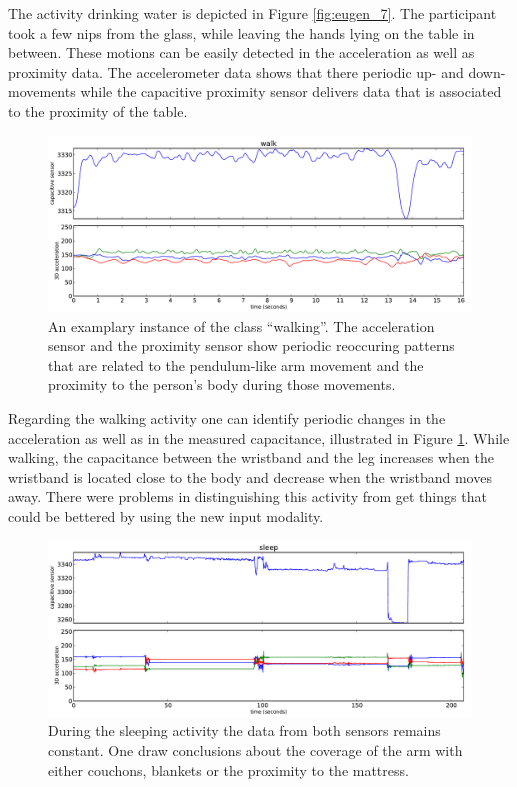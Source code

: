 \documentclass[runningheads,a4paper]{llncs}
\begin{document}
The activity drinking water is depicted in Figure \ref{fig:eugen_7}. The participant took a few nips from the glass, while leaving the hands lying on the table in between. These motions can be easily detected in the acceleration as well as proximity data. The accelerometer data shows that there periodic up- and down-movements while the capacitive proximity sensor delivers data that is associated to the proximity of the table.

\begin{figure}[htbp]
	\centering
		\includegraphics[width=1.00\textwidth]{../Auswertung/images/marko_8.pdf}
	\caption{An examplary instance of the class ``walking''. The acceleration sensor and the proximity sensor show periodic reoccuring patterns that are related to the pendulum-like arm movement and the proximity to the person's body during those movements.}
	\label{fig:marko_8}
\end{figure}

Regarding the walking activity one can identify periodic changes in the acceleration as well as in the measured capacitance, illustrated in Figure \ref{fig:marko_8}. While walking, the capacitance between the wristband and the leg increases when the wristband is located close to the body and decrease when the wristband moves away. There were problems in distinguishing this activity from get things that could be bettered by using the new input modality. 

\begin{figure}[htbp]
	\centering
		\includegraphics[width=1.00\textwidth]{../Auswertung/images/eugen_9.pdf}
	\caption{During the sleeping activity the data from both sensors remains constant. One draw conclusions about the coverage of the arm with either couchons, blankets or the proximity to the mattress.}
	\label{fig:eugen_9}
\end{figure}
\end{document}

